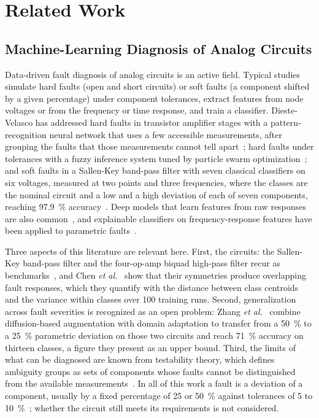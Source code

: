 \section{Related Work}
\label{sec:related}

\subsection{Machine-Learning Diagnosis of Analog Circuits}
Data-driven fault diagnosis of analog circuits is an active field. Typical studies simulate hard
faults (open and short circuits) or soft faults (a component shifted by a given percentage) under
component tolerances, extract features from node voltages or from the frequency or time response,
and train a classifier. Dieste-Velasco has addressed hard faults in transistor amplifier stages
with a pattern-recognition neural network that uses a few accessible measurements, after grouping
the faults that those measurements cannot tell apart~\cite{dieste2021}; hard faults under
tolerances with a fuzzy inference system tuned by particle swarm optimization~\cite{dieste2024};
and soft faults in a Sallen-Key band-pass filter with seven classical classifiers on six voltages,
measured at two points and three frequencies, where the classes are the nominal circuit and a low
and a high deviation of each of seven components, reaching \SI{97.9}{\percent}
accuracy~\cite{dieste2025}. Deep models that learn features from raw responses are also
common~\cite{yang2020}, and explainable classifiers on frequency-response features have been
applied to parametric faults~\cite{rajpal2026}.

Three aspects of this literature are relevant here. First, the circuits: the Sallen-Key band-pass
filter and the four-op-amp biquad high-pass filter recur as
benchmarks~\cite{dieste2025,chen2025,zhang2026,srimani2022}, and Chen \emph{et
al.}~\cite{chen2025} show that their symmetries produce overlapping fault responses, which they
quantify with the distance between class centroids and the variance within classes over 100
training runs. Second, generalization across fault severities is recognized as an open problem:
Zhang \emph{et al.}~\cite{zhang2026} combine diffusion-based augmentation with domain adaptation
to transfer from a \SI{50}{\percent} to a \SI{25}{\percent} parametric deviation on those two
circuits and reach \SI{71}{\percent} accuracy on thirteen classes, a figure they present as an
upper bound. Third, the limits of what can be diagnosed are known from testability theory, which
defines ambiguity groups as sets of components whose faults cannot be distinguished from the
available measurements~\cite{starzyk2000}. In all of this work a fault is a deviation of a
component, usually by a fixed percentage of 25 or \SI{50}{\percent} against tolerances of 5 to
\SI{10}{\percent}~\cite{chen2025,zhang2026}; whether the circuit still meets its requirements is
not considered.


